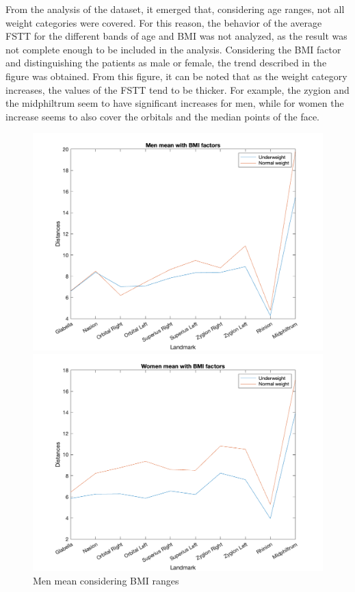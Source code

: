 \documentclass[journal,article,submit,pdftex,moreauthors]{Definitions/mdpi}
\begin{document}
From the analysis of the dataset, it emerged that, considering age ranges, not all weight categories were covered. For this reason, the behavior of the average FSTT for the different bands of age and BMI was not analyzed, as the result was not complete enough to be included in the analysis. 
Considering the BMI factor and distinguishing the patients as male or female, the trend described in the figure was obtained.
From this figure, it can be noted that as the weight category increases, the values of the FSTT tend to be thicker. For example, the zygion and the midphiltrum seem to have significant increases for men, while for women the increase seems to also cover the orbitals and the median points of the face.


\begin{figure}[H]
    \begin{minipage}{0.45\textwidth}
        \centering
        \includegraphics[width=\linewidth]{Definitions/Men_mean_BMI_withoutAge.png}
        \caption{Men mean considering BMI ranges}
        \label{fig:fig7}
    \end{minipage}
    \hfill
    \begin{minipage}{0.45\textwidth}
        \centering
        \includegraphics[width=\linewidth]{Definitions/Women_mean_BMI_withoutAge.png}

\end{minipage}
\end{figure}
\end{document}
